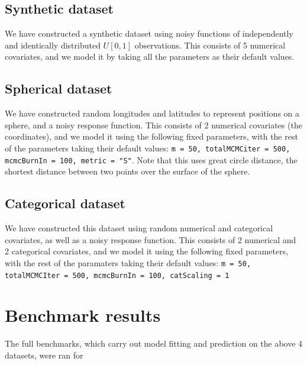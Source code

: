 \documentclass[11pt,twoside,a4paper]{article}
\begin{document}
\subsection{Synthetic dataset}
We have constructed a synthetic dataset using noisy functions of independently and identically distributed $U[0,1]$ observations. This consists of 5 numerical covariates, and we model it by taking all the parameters as their default values.
\subsection{Spherical dataset}
We have constructed random longitudes and latitudes to represent positions on a sphere, and a noisy response function. This consists of 2 numerical covariates (the coordinates), and we model it using the following fixed parameters, with the rest of the parameters taking their default values: \texttt{m = 50, totalMCMCiter = 500, mcmcBurnIn = 100, metric = "S"}. Note that this uses great circle distance, the shortest distance between two points over the surface of the sphere.
\subsection{Categorical dataset}
We have constructed this dataset using random numerical and categorical covariates, as well as a noisy response function. This consists of 2 numerical and 2 categorical covariates, and we model it using the following fixed parameters, with the rest of the paramaters taking their default values: \texttt{m = 50, totalMCMCIter = 500, mcmcBurnIn = 100, catScaling = 1}
\section{Benchmark results}
The full benchmarks, which carry out model fitting and prediction on the above 4 datasets, were ran for 
\end{document}
